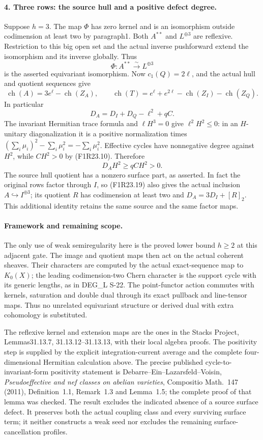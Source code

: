 \paragraph{4. Three rows: the source hull and a positive defect degree.}
Suppose $h=3$. The map $\Phi$ has zero kernel and
is an isomorphism outside codimension at least
two by paragraph1. Both $A^{**}$ and $L^{\oplus3}$
are reflexive. Restriction to this big open set
and the actual inverse pushforward extend the
isomorphism and its inverse globally. Thus
\[
                    \Phi:A^{**}\xrightarrow{\sim}L^{\oplus3}
 \tag{F1R23.19}
\]
is the asserted equivariant isomorphism. Now
$c_1(Q)=2\ell$, and the actual hull and quotient
sequences give
\[
           \operatorname{ch}(A)=3e^\ell-\operatorname{ch}(Z_A),
 \qquad
           \operatorname{ch}(T)=e^\ell+e^{2\ell}
                            -\operatorname{ch}(Z_I)-\operatorname{ch}(Z_Q).
 \tag{F1R23.20}
\]
In particular
\[
                  D_A=D_I+D_Q-\ell^2+qC.
 \tag{F1R23.21}
\]
The invariant Hermitian trace formula and
$\ell H^3=0$ give $\ell^2H^2\le0$:
in an $H$-unitary diagonalization it is a positive
normalization times
$(\sum_i\mu_i)^2-\sum_i\mu_i^2=-\sum_i\mu_i^2$.
Effective cycles have nonnegative degree against
$H^2$, while $CH^2>0$ by (F1R23.10). Therefore
\[
                       D_AH^2\ge qCH^2>0.
 \tag{F1R23.22}
\]
The source hull quotient has a nonzero surface
part, as asserted. In fact the original rows
factor through $I$, so (F1R23.19) also gives the
actual inclusion $A\hookrightarrow I^{\oplus3}$;
its quotient $R$ has codimension at least two and
$D_A=3D_I+[R]_2$. This additional identity retains
the same source and the same factor maps.

\paragraph{Framework and remaining scope.}
The only use of weak semiregularity here is the
proved lower bound $h\ge2$ at this adjacent gate.
The image and quotient maps then act on the actual
coherent sheaves. Their characters are computed
by the actual exact-sequence map to $K_0(X)$;
the leading codimension-two Chern character is
the support cycle with its generic lengths, as
in DEG\_L S-22. The point-functor action commutes
with kernels, saturation and double dual through
its exact pullback and line-tensor maps. Thus no
unrelated equivariant structure or derived dual
with extra cohomology is substituted.

The reflexive kernel and extension maps are the
ones in the Stacks Project, Lemmas31.13.7,
31.13.12--31.13.13, with their local algebra
proofs. The positivity step is supplied by the
explicit integration-current average and the
complete four-dimensional Hermitian calculation
above. The precise published
cycle-to-invariant-form positivity statement is
Debarre--Ein--Lazarsfeld--Voisin,
\emph{Pseudoeffective and nef classes on abelian
varieties}, Compositio Math.~147 (2011),
Definition~1.1, Remark~1.3 and Lemma~1.5;
the complete proof of that lemma was checked.
The result excludes the indicated absence
of a source surface defect. It preserves both
the actual coupling class and every surviving
surface term; it neither constructs a weak seed
nor excludes the remaining surface-cancellation
profiles.
